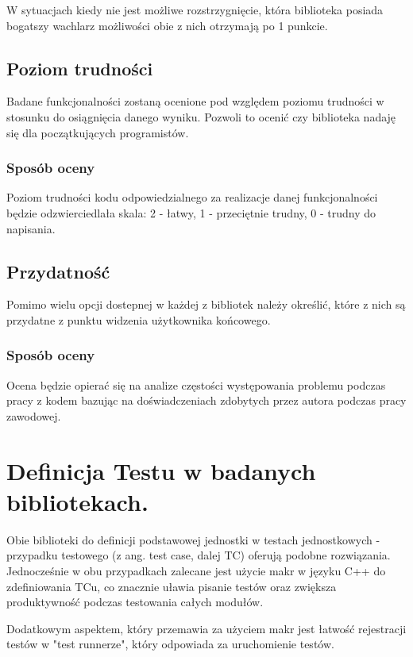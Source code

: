 \documentclass[12pt,a4paper,notitlepage]{report}
\begin{document}
W sytuacjach kiedy nie jest możliwe rozstrzygnięcie, która biblioteka posiada bogatszy wachlarz możliwości obie z nich otrzymają po 1 punkcie.

\section{Poziom trudności}

Badane funkcjonalności zostaną ocenione pod względem poziomu trudności w stosunku do osiągnięcia danego wyniku. Pozwoli to ocenić czy biblioteka nadaję się dla początkujących programistów.

\subsection{Sposób oceny}
Poziom trudności kodu odpowiedzialnego za realizacje danej funkcjonalności będzie odzwierciedlała skala: 2 - łatwy, 1 - przeciętnie trudny, 0 - trudny do napisania.

\section{Przydatność}

Pomimo wielu opcji dostepnej w każdej z bibliotek należy określić, które z nich są przydatne z punktu widzenia użytkownika końcowego.

\subsection{Sposób oceny}
Ocena będzie opierać się na analize częstości występowania problemu podczas pracy z kodem bazując na doświadczeniach zdobytych przez autora podczas pracy zawodowej.

\chapter{Definicja Testu w badanych bibliotekach.}

Obie biblioteki do definicji podstawowej jednostki w testach jednostkowych - przypadku testowego (z ang. test case, dalej TC) oferują podobne rozwiązania. Jednocześnie w obu przypadkach zalecane jest użycie makr w języku C++ do zdefiniowania TCu, co znacznie uławia pisanie testów oraz zwiększa produktywność podczas testowania całych modułów.

Dodatkowym aspektem, który przemawia za użyciem makr jest łatwość rejestracji testów w "test runnerze", który odpowiada za uruchomienie testów.
\end{document}
